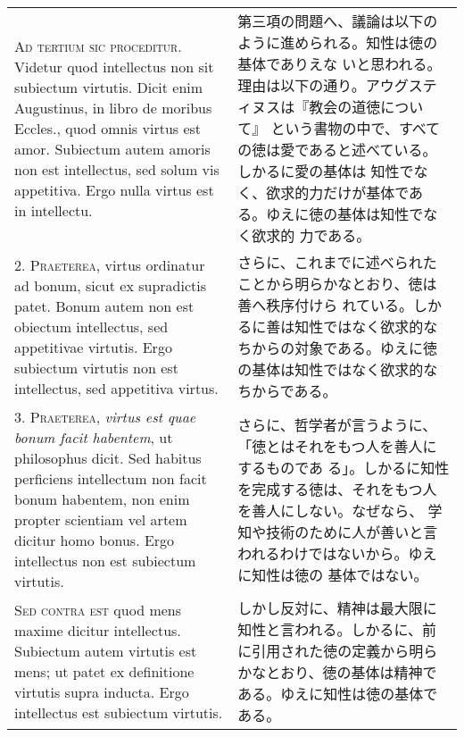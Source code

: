 \documentclass[10pt]{jsarticle}
\begin{document}
\begin{longtable}{p{21em}p{21em}}
{\scshape Ad tertium sic proceditur}. Videtur quod intellectus non sit
subiectum virtutis. Dicit enim Augustinus, in libro de moribus
Eccles., quod omnis virtus est amor. Subiectum autem amoris non est
intellectus, sed solum vis appetitiva. Ergo nulla virtus est in
intellectu.

&

第三項の問題へ、議論は以下のように進められる。知性は徳の基体でありえな
いと思われる。理由は以下の通り。アウグスティヌスは『教会の道徳について』
という書物の中で、すべての徳は愛であると述べている。しかるに愛の基体は
知性でなく、欲求的力だけが基体である。ゆえに徳の基体は知性でなく欲求的
力である。

\\

2. {\scshape Praeterea}, virtus ordinatur ad bonum, sicut ex supradictis
patet. Bonum autem non est obiectum intellectus, sed appetitivae
virtutis. Ergo subiectum virtutis non est intellectus, sed appetitiva
virtus.

&

さらに、これまでに述べられたことから明らかなとおり、徳は善へ秩序付けら
れている。しかるに善は知性ではなく欲求的なちからの対象である。ゆえに徳
の基体は知性ではなく欲求的なちからである。

\\



3. {\scshape Praeterea}, {\itshape virtus est quae bonum facit
habentem}, ut philosophus dicit. Sed habitus perficiens intellectum
non facit bonum habentem, non enim propter scientiam vel artem dicitur
homo bonus. Ergo intellectus non est subiectum virtutis.

&

さらに、哲学者が言うように、「徳とはそれをもつ人を善人にするものであ
る」。しかるに知性を完成する徳は、それをもつ人を善人にしない。なぜなら、
学知や技術のために人が善いと言われるわけではないから。ゆえに知性は徳の
基体ではない。

\\

{\scshape Sed contra est} quod mens maxime dicitur
intellectus. Subiectum autem virtutis est mens; ut patet ex
definitione virtutis supra inducta. Ergo intellectus est subiectum
virtutis.

&

しかし反対に、精神は最大限に知性と言われる。しかるに、前に引用された徳の定義から明らかなとおり、徳の基体は精神である。ゆえに知性は徳の基体である。


\end{longtable}
\end{document}
